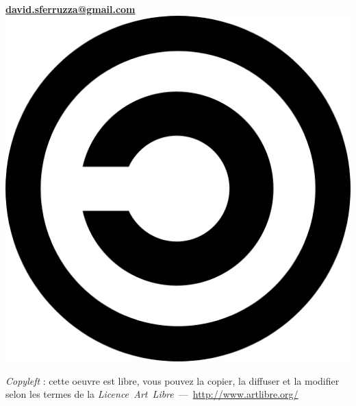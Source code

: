 \begin{titlepage}
\begin{center}
\begin{minipage}[c]{9cm}
	\begin{center}
	\textbf{\titre}
	\linebreak
	\linebreak
	\moi\\
	\textbf{\href{mailto:david.sferruzza@gmail.com}{david.sferruzza@gmail.com}}
	\linebreak
	\linebreak
	\linebreak
	\linebreak
	\includegraphics[scale=.05]{images/copyleft.png} 
	\end{center}
	\textit{Copyleft} : cette oeuvre est libre, vous pouvez la copier,
	la diffuser et la modifier selon les termes de la
	\textit{Licence~Art~Libre}~---~\url{http://www.artlibre.org/}
\end{minipage}
\end{center}
\vfill ~
\end{titlepage}

